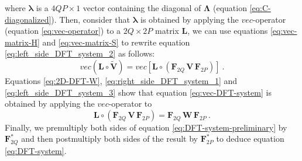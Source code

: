 where $\boldsymbol{\lambda}$ is a $4QP \times 1$ vector containing the diagonal of 
$\boldsymbol{\Lambda}$ (equation \ref{eq:C-diagonalized}).
Then, consider that $\boldsymbol{\lambda}$ is obtained by applying the $vec$-operator 
(equation \ref{eq:vec-operator}) to a $2Q \times 2P$ matrix $\mathbf{L}$, we can use 
equations \ref{eq:vec-matrix-H} and \ref{eq:vec-matrix-S} to rewrite equation 
\ref{eq:left_side_DFT_system_2} as follows:
\begin{equation}
vec \left( \mathbf{L} \circ \tilde{\mathbf{V}} \right) = 
vec \left[ \mathbf{L} \circ 
\left( \mathbf{F}_{2Q} \, \mathbf{V} \, \mathbf{F}_{2P} \right) 
\right] \: .
\label{eq:left_side_DFT_system_3}
\end{equation}
Equations \ref{eq:2D-DFT-W}, \ref{eq:right_side_DFT_system_1} and 
\ref{eq:left_side_DFT_system_3} show that equation \ref{eq:vec-DFT-system}
is obtained by applying the $vec$-operator to 
\begin{equation}
\mathbf{L} \circ \left( \mathbf{F}_{2Q} \, \mathbf{V} \, \mathbf{F}_{2P} \right) = 
\mathbf{F}_{2Q} \, \mathbf{W} \, \mathbf{F}_{2P} \: .
\label{eq:DFT-system-preliminary}
\end{equation}
Finally, we premultiply both sides of equation \ref{eq:DFT-system-preliminary} by 
$\mathbf{F}_{2Q}^{\ast}$ and then postmultiply both sides of the result by 
$\mathbf{F}_{2P}^{\ast}$ to deduce equation \ref{eq:DFT-system}.